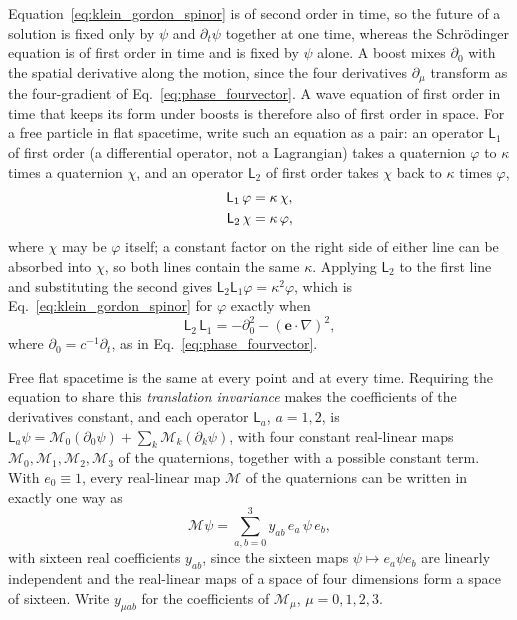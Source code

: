 \documentclass[aps,prd,onecolumn,tightenlines,nofootinbib,notitlepage,11pt,floatfix]{revtex4-2}
\theoremstyle{indentedtheorem}
\begin{document}
Equation~\eqref{eq:klein_gordon_spinor} is of second order in time, so the future of a solution is fixed only by $\psi$ and $\partial_t\psi$ together at one time, whereas the Schr\"odinger equation is of first order in time and is fixed by $\psi$ alone. A boost mixes $\partial_0$ with the spatial derivative along the motion, since the four derivatives $\partial_\mu$ transform as the four-gradient of Eq.~\eqref{eq:phase_fourvector}. A wave equation of first order in time that keeps its form under boosts is therefore also of first order in space. For a free particle in flat spacetime, write such an equation as a pair: an operator $\mathsf{L}_1$ of first order (a differential operator, not a Lagrangian) takes a quaternion $\varphi$ to $\kappa$ times a quaternion $\chi$, and an operator $\mathsf{L}_2$ of first order takes $\chi$ back to $\kappa$ times $\varphi$,
\begin{align}
    \mathsf{L}_1 \, \varphi &= \kappa \, \chi , \notag\\
    \mathsf{L}_2 \, \chi &= \kappa \, \varphi ,
    \label{eq:first_order_pair}
\end{align}
where $\chi$ may be $\varphi$ itself; a constant factor on the right side of either line can be absorbed into $\chi$, so both lines contain the same $\kappa$. Applying $\mathsf{L}_2$ to the first line and substituting the second gives $\mathsf{L}_2\mathsf{L}_1\varphi=\kappa^2\varphi$, which is Eq.~\eqref{eq:klein_gordon_spinor} for $\varphi$ exactly when
\begin{equation}
    \mathsf{L}_2 \, \mathsf{L}_1 = -\partial_0^2 - (\mathbf{e}\cdot\nabla)^2 ,
    \label{eq:factor_target}
\end{equation}
where $\partial_0=c^{-1}\partial_t$, as in Eq.~\eqref{eq:phase_fourvector}.

Free flat spacetime is the same at every point and at every time. Requiring the equation to share this \emph{translation invariance} makes the coefficients of the derivatives constant, and each operator $\mathsf{L}_a$, $a=1,2$, is $\mathsf{L}_a\psi=\mathcal{M}_0(\partial_0\psi)+\sum_k \mathcal{M}_k(\partial_k\psi)$, with four constant real-linear maps $\mathcal{M}_0,\mathcal{M}_1,\mathcal{M}_2,\mathcal{M}_3$ of the quaternions, together with a possible constant term. With $e_0\equiv1$, every real-linear map $\mathcal{M}$ of the quaternions can be written in exactly one way as
\begin{equation}
    \mathcal{M}\psi = \sum_{a,b=0}^{3} y_{ab} \, e_a \, \psi \, e_b ,
    \label{eq:two_sided_basis}
\end{equation}
with sixteen real coefficients $y_{ab}$, since the sixteen maps $\psi\mapsto e_a\psi e_b$ are linearly independent and the real-linear maps of a space of four dimensions form a space of sixteen. Write $y_{\mu ab}$ for the coefficients of $\mathcal{M}_\mu$, $\mu=0,1,2,3$.
\end{document}
